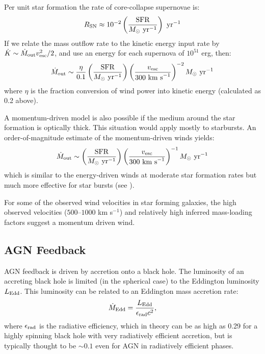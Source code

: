 Per unit star formation the rate of core-collapse supernovae is:
\begin{equation}
R_{\rm SN} \approx 10^{-2} \left(\frac{\rm SFR}{M_\odot {\rm
~yr}^{-1}}\right) {\rm ~yr}^{-1}
\end{equation}
If we relate the mass outflow rate to the kinetic energy input rate by
$\dot K \sim {\dot M}_{\rm out} v_{\rm esc}^2 / 2$, and use an energy for
each supernova of $10^{51}$ erg, then:
\begin{equation}
\dot M_{\rm out} \sim \frac{\eta}{0.1} \left(\frac{{\rm SFR}}{M_\odot
{\rm ~yr}^{-1}}\right) \left(\frac{v_{\rm esc}}{300 {\rm
~km~s}^{-1}}\right)^{-2} M_\odot {\rm ~yr}^{-1}
\end{equation}
where $\eta$ is the fraction conversion of wind power into kinetic
energy (calculated as 0.2 above). 

A momentum-driven model is also possible if the medium around the star
formation is optically thick. This situation would apply mostly to
starbursts. An order-of-magnitude estimate of the momentum-driven
winds yields:
\begin{equation}
\dot M_{\rm out} \sim \left(\frac{{\rm SFR}}{M_\odot
{\rm ~yr}^{-1}}\right) \left(\frac{v_{\rm esc}}{300 {\rm
~km~s}^{-1}}\right)^{-1} M_\odot {\rm ~yr}^{-1}
\end{equation}
which is similar to the energy-driven winds at moderate star formation
rates but much more effective for star bursts
(see \citealt{murray05b}).

For some of the observed wind velocities in star forming galaxies, the
high observed velocities ($500$--$1000$ km s$^{-1}$) and relatively
high inferred mass-loading factors suggest a momentum driven wind.

\subsection{AGN Feedback}

AGN feedback is driven by accretion onto a black hole. The luminosity
of an accreting black hole is limited (in the spherical case) to the
Eddington luminosity $L_{\rm Edd}$. This luminosity can be related to
an Eddington mass accretion rate:
\begin{equation}
{\dot M}_{\rm Edd} = \frac{L_{\rm Edd}} {\epsilon_{\rm rad} c^2},
\end{equation}
where $\epsilon_{\rm rad}$ is the radiative efficiency, which in
theory can be as high as 0.29 for a highly spinning black hole with
very radiatively efficient accretion, but is typically thought to be
$\sim 0.1$ even for AGN in radiatively efficient phases. 

